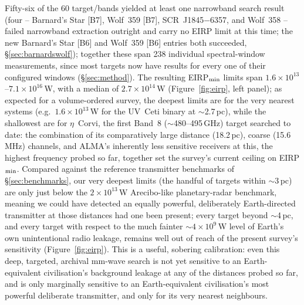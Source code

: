\documentclass{openjournal}
\begin{document}
Fifty-six of the 60 target/bands yielded at least one narrowband search
result (four -- Barnard's Star [B7], Wolf~359 [B7], SCR~J1845$-$6357, and
Wolf~358 -- failed narrowband extraction outright and carry no EIRP
limit at this time; the new Barnard's Star [B6] and Wolf~359 [B6] entries
both succeeded, \S\ref{sec:barnardswolf}); together these span 238 individual spectral-window measurements, since
most targets now have results for every one of their configured windows
(\S\ref{sec:method}). The resulting EIRP$_{\rm min}$ limits span
$1.6\times10^{13}$--$7.1\times10^{16}$\,W, with a median of
$2.7\times10^{14}$\,W (Figure~\ref{fig:eirp}, left panel); as expected
for a volume-ordered survey, the deepest limits are for the very nearest
systems (e.g.\ $1.6\times10^{13}$\,W for the UV~Ceti binary at $\sim$2.7\,pc),
while the shallowest are for $\eta$~Corvi, the first Band~8 ($\sim$480--495\,GHz)
target searched to date: the combination of its comparatively large
distance (18.2\,pc), coarse (15.6\,MHz) channels, and ALMA's inherently
less sensitive receivers at this, the highest frequency probed so far,
together set the survey's current ceiling on EIRP$_{\rm min}$.
Compared against the reference transmitter benchmarks of
\S\ref{sec:benchmarks}, our very deepest limits (the handful of targets
within $\sim$3\,pc) are only just below the $2\times10^{13}$\,W
Arecibo-like planetary-radar benchmark, meaning we could have detected an
equally powerful, deliberately Earth-directed transmitter at those
distances had one been present; every target beyond $\sim$4\,pc, and
every target with respect to the much fainter $\sim4\times10^{9}$\,W
level of Earth's own unintentional radio leakage, remains well out of
reach of the present survey's sensitivity (Figure~\ref{fig:eirp}). This
is a useful, sobering calibration: even this deep, targeted, archival
mm-wave search is not yet sensitive to an Earth-equivalent civilisation's
background leakage at any of the distances probed so far, and is only
marginally sensitive to an Earth-equivalent civilisation's most powerful
deliberate transmitter, and only for its very nearest neighbours.
\end{document}
